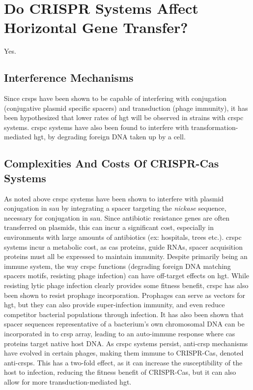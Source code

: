 \documentclass[12pt,letter]{article}
\begin{document}
\section{Do CRISPR Systems Affect Horizontal Gene Transfer?}
Yes.
\subsection{Interference Mechanisms}
Since \ac{crsp}s have been shown to be capable of interfering with conjugation (conjugative plasmid specific spacers) and transduction (phage immunity), it has been hypothesized that lower rates of \ac{hgt} will be observed in strains with \ac{crspc} systems\citep{staphlim}.
\ac{crspc} systems have also been found to interfere with transformation-mediated \ac{hgt}, by degrading foreign DNA taken up by a cell\citep{climtrans}.
\subsection{Complexities And Costs Of CRISPR-Cas Systems}
As noted above \ac{crspc} systems have been shown to interfere with plasmid conjugation in \ac{sau} by integrating a spacer targeting the \textit{nickase} sequence, necessary for conjugation in \ac{sau}\citep{staphlim}.
Since antibiotic resistance genes are often transferred on plasmids, this can incur a significant cost, especially in environments with large amounts of antibiotics (ex: hospitals, trees etc.)\citep{hospital}.
\ac{crspc} systems incur a metabolic cost, as \ac{cas} proteins, guide RNAs, spacer acquisition proteins must all be expressed to maintain immunity\citep{crispgen}.
Despite primarily being an immune system, the way \ac{crspc} functions (degrading foreign DNA matching spacers motifs, resisting phage infection) can have off-target effects on \ac{hgt}\citep{acqorres}.
While resisting lytic phage infection clearly provides some fitness benefit, \ac{crspc} has also been shown to resist prophage incorporation\citep{acqorres}.
Prophages can serve as vectors for \ac{hgt}, but they can also provide super-infection immunity, and even reduce competitor bacterial populations through infection\citep{acqorres,transhgt}.
It has also been shown that spacer sequences representative of a bacterium's own chromosomal DNA can be incorporated in to \ac{crsp} array, leading to an auto-immune response where \ac{cas} proteins target native host DNA\citep{selfcrisp}.
As \ac{crspc} systems persist, anti-\ac{crsp} mechanisms have evolved in certain phages, making them immune to CRISPR-Cas, denoted anti-\ac{crsp}s\citep{acqorres}.
This has a two-fold effect, as it can increase the susceptibility of the host to infection, reducing the fitness benefit of CRISPR-Cas, but it can also allow for more transduction-mediated \ac{hgt}\citep{acqorres}.
\end{document}
